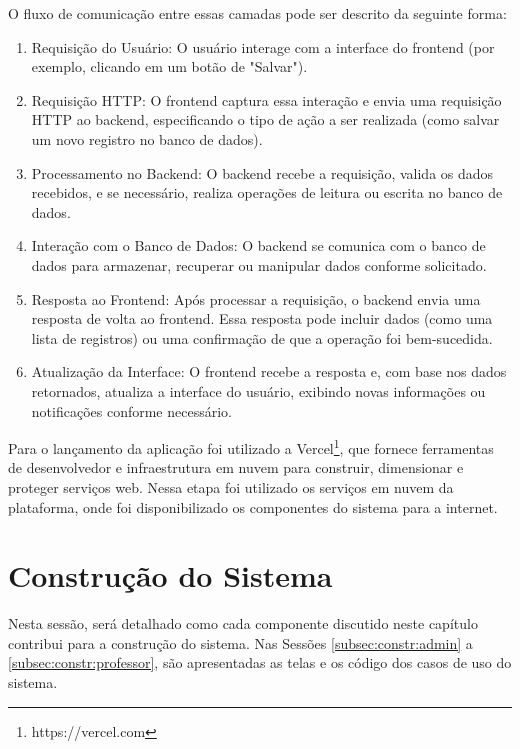 O fluxo de comunicação entre essas camadas pode ser descrito da seguinte forma:

\begin{enumerate}
    \item Requisição do Usuário: O usuário interage com a interface do frontend (por exemplo, clicando em um botão de "Salvar").
    \item Requisição HTTP: O frontend captura essa interação e envia uma requisição HTTP ao backend, especificando o tipo de ação a ser realizada (como salvar um novo registro no banco de dados).
    \item Processamento no Backend: O backend recebe a requisição, valida os dados recebidos, e se necessário, realiza operações de leitura ou escrita no banco de dados.
    \item Interação com o Banco de Dados: O backend se comunica com o banco de dados para armazenar, recuperar ou manipular dados conforme solicitado.
    \item Resposta ao Frontend: Após processar a requisição, o backend envia uma resposta de volta ao frontend. Essa resposta pode incluir dados (como uma lista de registros) ou uma confirmação de que a operação foi bem-sucedida.
    \item Atualização da Interface: O frontend recebe a resposta e, com base nos dados retornados, atualiza a interface do usuário, exibindo novas informações ou notificações conforme necessário.
\end{enumerate}

Para o lançamento da aplicação foi utilizado a Vercel\footnote{https://vercel.com}, que fornece ferramentas de desenvolvedor e infraestrutura em nuvem para construir, dimensionar e proteger serviços web. Nessa etapa foi utilizado os serviços em nuvem da plataforma, onde foi disponibilizado os componentes do sistema para a internet.







\section{Construção do Sistema}

Nesta sessão, será detalhado como cada componente discutido neste capítulo contribui para a construção do sistema. Nas Sessões \ref{subsec:constr:admin} a \ref{subsec:constr:professor}, são apresentadas as telas e os código dos casos de uso do sistema.



